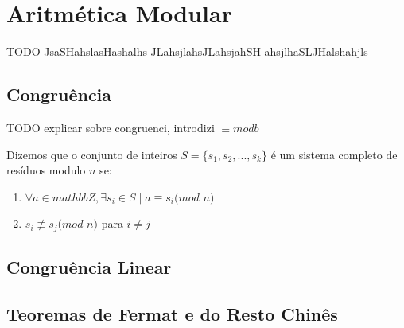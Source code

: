 
\chapter{Aritmética Modular} %

\label{Chapter2} %

TODO
JsaSHahslasHashalhs JLahsjlahsJLahsjahSH ahsjlhaSLJHalshahjls


\section{Congruência}

\begin{definition}
TODO explicar sobre congruenci, introdizi $\equiv mod b$
\end{definition}

\begin{definition}
Dizemos que o conjunto de inteiros $S = \{s_1, s_2, ..., s_k\}$ é um sistema completo de resíduos modulo $n$ se:
\begin{enumerate}
\item$\forall a \in mathbb{Z}, \exists s_i \in S \mid a \equiv s_i (mod$ $n)$
\item$s_i \not\equiv s_j (mod $ $n)$ para $i \neq j$
\end{enumerate}
\end{definition}


\section{Congruência Linear}




\section{Teoremas de Fermat e do Resto Chinês}

